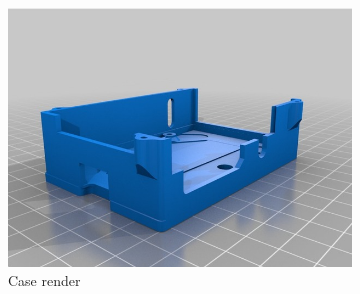 \begin{figure}[H]
\begin{subfigure}{0.5\textwidth}
\centering
\includegraphics[scale=0.25]{images/drone-build-3d-case-render.jpg}
\caption{Case render}
\label{fig:fcarpc1}
\end{subfigure}
\begin{subfigure}{0.5\textwidth}
\centering

\end{subfigure}
\end{figure}
